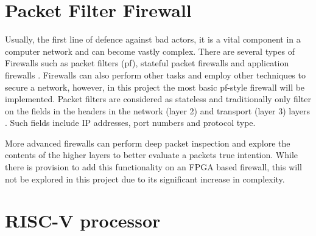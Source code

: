 \section{Packet Filter Firewall}

Usually, the first line of defence against bad actors, it is a vital component in a computer network and can become vastly complex. There are several
types of Firewalls such as packet filters (pf), stateful packet firewalls and application firewalls \cite{FirewallsBook}. Firewalls can also perform 
other tasks and employ other techniques to secure a network, however, in this project the most basic pf-style firewall will be implemented. 
Packet filters are considered as stateless and traditionally only filter on the fields in the headers in the network (layer 2) and transport 
(layer 3) layers \cite{FirewallsBook}. Such fields include IP addresses, port numbers and protocol type.

More advanced firewalls can perform deep packet inspection and explore the contents of the higher layers to better evaluate a packets true intention. 
While there is provision to add this functionality on an FPGA based firewall, this will not be explored in this project due to its significant increase 
in complexity. 


\section{RISC-V processor}
